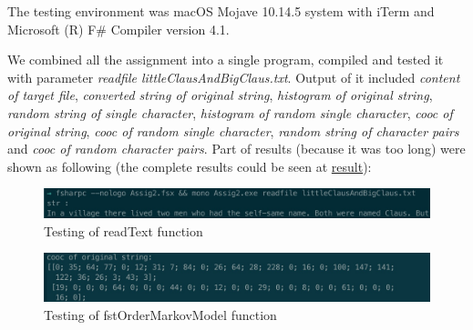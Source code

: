 \documentclass{article}
\begin{document}
The testing environment was macOS Mojave 10.14.5 system with iTerm and Microsoft (R) F\# Compiler version 4.1.

We combined all the assignment into a single program, compiled and tested it with parameter \emph{readfile littleClausAndBigClaus.txt}. Output of it included \emph{content of target file}, \emph{converted string of original string}, \emph{histogram of original string}, \emph{random string of single character}, \emph{histogram of random single character}, \emph{cooc of original string}, \emph{cooc of random single character}, \emph{random string of character pairs} and \emph{cooc of random character pairs}. Part of results (because it was too long) were shown as following (the complete results could be seen at \href{https://github.com/Medill-East/ComputerScience/blob/master/Professional%20Core%20Courses/Functional%20Programming/SummerSchool/Learning%20Material/Report/Hand-in/2/Result/Result.txt}{result}):

\begin{figure}[htbp]
      \centering
      \includegraphics[width=\linewidth]{inputandread}
      \caption{Testing of readText function}
      \label{fig:inputandread}
\end{figure}




\begin{figure}[htbp]
      \centering
      \includegraphics[width=\linewidth]{coocoforiginalstring}
      \caption{Testing of fstOrderMarkovModel function}
      \label{fig:coocoforiginalstring}
\end{figure}
\end{document}
